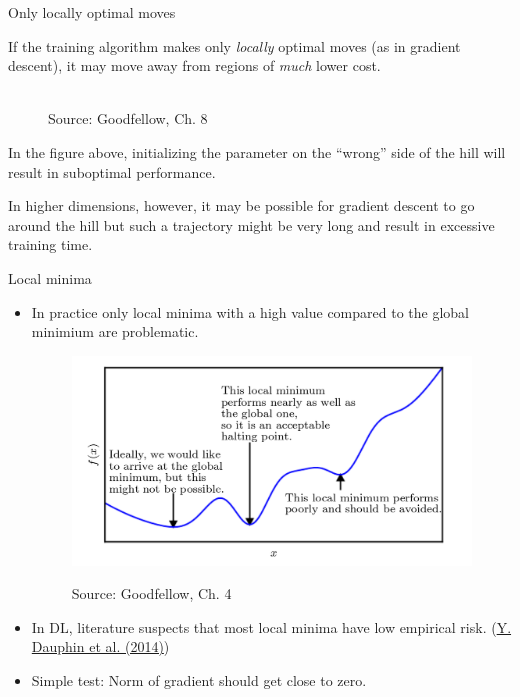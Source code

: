 \begin{frame} {Only locally optimal moves}
\begin{itemize}
\small{
\item If the training algorithm makes only \textit{locally} optimal moves (as in gradient descent), it may move away from regions of \textit{much} lower cost.
\begin{figure}
	\centering
	\tiny{\\Source: Goodfellow, Ch. 8}
\end{figure}
\item In the figure above, initializing the parameter on the ``wrong'' side of the hill will result in suboptimal performance.
\item In higher dimensions, however, it may be possible for gradient descent to go around the hill but such a trajectory might be very long and result in excessive training time.}
\end{itemize}
\end{frame}

\begin{vbframe} {Local minima}

\begin{itemize}
\item In practice only local minima with a high value compared to the global minimium are problematic.
\begin{figure}
\begin{center}
	\includegraphics[width=.6\textwidth]{figure_man/minima.png}
\end{center}
\tiny{Source: Goodfellow, Ch. 4}
\end{figure}
\item In DL, literature suspects that most local minima have low empirical risk. (\href{https://arxiv.org/abs/1406.2572}{Y. Dauphin et al. (2014)})
\item Simple test: Norm of gradient should get close to zero.
\end{itemize}
\end{vbframe}

